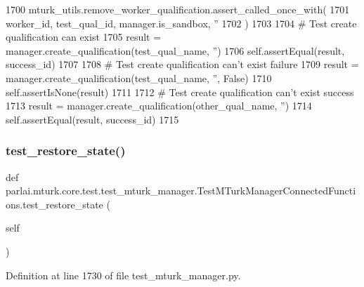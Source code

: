 \begin{DoxyCode}
1700         mturk\_utils.remove\_worker\_qualification.assert\_called\_once\_with(
1701             worker\_id, test\_qual\_id, manager.is\_sandbox, \textcolor{stringliteral}{''}
1702         )
1703 
1704         \textcolor{comment}{# Test create qualification can exist}
1705         result = manager.create\_qualification(test\_qual\_name, \textcolor{stringliteral}{''})
1706         self.assertEqual(result, success\_id)
1707 
1708         \textcolor{comment}{# Test create qualification can't exist failure}
1709         result = manager.create\_qualification(test\_qual\_name, \textcolor{stringliteral}{''}, \textcolor{keyword}{False})
1710         self.assertIsNone(result)
1711 
1712         \textcolor{comment}{# Test create qualification can't exist success}
1713         result = manager.create\_qualification(other\_qual\_name, \textcolor{stringliteral}{''})
1714         self.assertEqual(result, success\_id)
1715 
\end{DoxyCode}
\mbox{\label{classparlai_1_1mturk_1_1core_1_1test_1_1test__mturk__manager_1_1TestMTurkManagerConnectedFunctions_a24c22ab877abba504f75e980f2ce4143}} 
\subsubsection{\texorpdfstring{test\+\_\+restore\+\_\+state()}{test\_restore\_state()}}
{\footnotesize\ttfamily def parlai.\+mturk.\+core.\+test.\+test\+\_\+mturk\+\_\+manager.\+Test\+M\+Turk\+Manager\+Connected\+Functions.\+test\+\_\+restore\+\_\+state (\begin{DoxyParamCaption}\item[{}]{self }\end{DoxyParamCaption})}



Definition at line 1730 of file test\+\_\+mturk\+\_\+manager.\+py.


